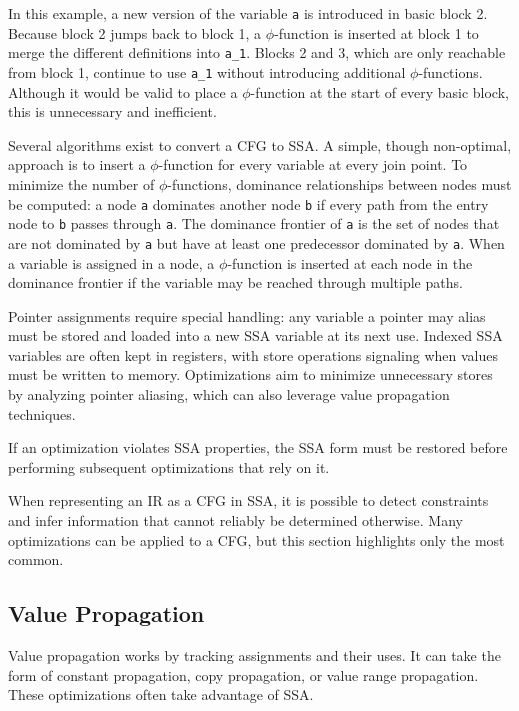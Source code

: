 In this example, a new version of the variable \texttt{a} is introduced in basic block 2. Because block 2 jumps back to block 1, a $\phi$-function is inserted at block 1 to merge the different definitions into \texttt{a\_1}. Blocks 2 and 3, which are only reachable from block 1, continue to use \texttt{a\_1} without introducing additional $\phi$-functions. Although it would be valid to place a $\phi$-function at the start of every basic block, this is unnecessary and inefficient.

Several algorithms exist to convert a \ac{CFG} to \ac{SSA}\cite{sarkar-ssa}. A simple, though non-optimal, approach is to insert a $\phi$-function for every variable at every join point. To minimize the number of $\phi$-functions, dominance relationships between nodes must be computed: a node \texttt{a} dominates another node \texttt{b} if every path from the entry node to \texttt{b} passes through \texttt{a}. The dominance frontier of \texttt{a} is the set of nodes that are not dominated by \texttt{a} but have at least one predecessor dominated by \texttt{a}. When a variable is assigned in a node, a $\phi$-function is inserted at each node in the dominance frontier if the variable may be reached through multiple paths\cite{sarkar-ssa,klara-ssa}.

Pointer assignments require special handling: any variable a pointer may alias must be stored and loaded into a new SSA variable at its next use. Indexed SSA variables are often kept in registers, with store operations signaling when values must be written to memory. Optimizations aim to minimize unnecessary stores by analyzing pointer aliasing, which can also leverage value propagation techniques\cite{dragon-book}.

If an optimization violates SSA properties, the SSA form must be restored before performing subsequent optimizations that rely on it.

When representing an \ac{IR} as a \ac{CFG} in \ac{SSA}, it is possible to detect constraints and infer information that cannot reliably be determined otherwise. Many optimizations can be applied to a \ac{CFG}, but this section highlights only the most common.

\subsection{Value Propagation}

Value propagation works by tracking assignments and their uses. It can take the form of constant propagation, copy propagation, or value range propagation. These optimizations often take advantage of \acf{SSA}. 

